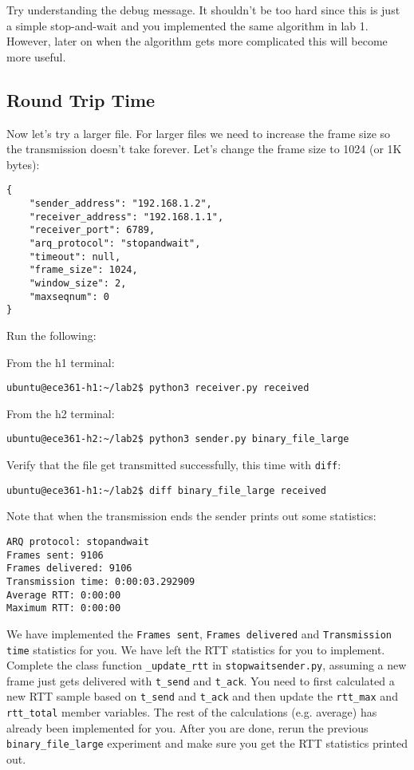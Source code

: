\documentclass[11pt]{article}
\begin{document}
Try understanding the debug message. It shouldn't be too hard since this is just a simple stop-and-wait and you implemented the same algorithm in lab 1. However, later on when the algorithm gets more complicated this will become more useful.

\subsection{Round Trip Time}
Now let's try a larger file. For larger files we need to increase the frame size so the transmission doesn't take forever. Let's change the frame size to 1024 (or 1K bytes):
\begin{lstlisting}[style=ece361-shell-base, caption={Configuration For Large File}]
{
    "sender_address": "192.168.1.2",
    "receiver_address": "192.168.1.1",
    "receiver_port": 6789,
    "arq_protocol": "stopandwait",
    "timeout": null,
    "frame_size": 1024,
    "window_size": 2,
    "maxseqnum": 0
}
\end{lstlisting}
Run the following:

From the h1 terminal:
\begin{lstlisting}[style=ece361-shell-base]
ubuntu@ece361-h1:~/lab2$ python3 receiver.py received
\end{lstlisting}
From the h2 terminal:
\begin{lstlisting}[style=ece361-shell-base]
ubuntu@ece361-h2:~/lab2$ python3 sender.py binary_file_large
\end{lstlisting}


Verify that the file get transmitted successfully, this time with \texttt{diff}:
\begin{lstlisting}[style=ece361-shell-base]
ubuntu@ece361-h1:~/lab2$ diff binary_file_large received
\end{lstlisting}

Note that when the transmission ends the sender prints out some statistics:

\begin{lstlisting}[style=ece361-shell-base]
ARQ protocol: stopandwait
Frames sent: 9106
Frames delivered: 9106
Transmission time: 0:00:03.292909
Average RTT: 0:00:00
Maximum RTT: 0:00:00
\end{lstlisting}

We have implemented the \texttt{Frames sent}, \texttt{Frames delivered} and \texttt{Transmission time} statistics for you.
We have left the RTT statistics for you to implement.
Complete the class function \texttt{\_update\_rtt} in \texttt{stopwaitsender.py}, assuming a new frame just gets delivered with \texttt{t\_send} and \texttt{t\_ack}.
You need to first calculated a new RTT sample based on \texttt{t\_send} and \texttt{t\_ack} and then update the \texttt{rtt\_max} and \texttt{rtt\_total} member variables.
The rest of the calculations (e.g. average) has already been implemented for you.
After you are done, rerun the previous \texttt{binary\_file\_large} experiment and make sure you get the RTT statistics printed out.
\end{document}
